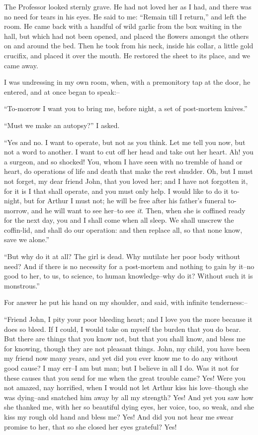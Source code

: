 \documentclass[12pt,openright]{book}
\begin{document}
The Professor looked sternly grave. He had not loved her as I had, and there was no need for tears in his eyes. He said to me: “Remain till I return,” and left the room. He came back with a handful of wild garlic from the box waiting in the hall, but which had not been opened, and placed the flowers amongst the others on and around the bed. Then he took from his neck, inside his collar, a little gold crucifix, and placed it over the mouth. He restored the sheet to its place, and we came away.

I was undressing in my own room, when, with a premonitory tap at the door, he entered, and at once began to speak:–

“To-morrow I want you to bring me, before night, a set of post-mortem knives.”

“Must we make an autopsy?” I asked.

“Yes and no. I want to operate, but not as you think. Let me tell you now, but not a word to another. I want to cut off her head and take out her heart. Ah! you a surgeon, and so shocked! You, whom I have seen with no tremble of hand or heart, do operations of life and death that make the rest shudder. Oh, but I must not forget, my dear friend John, that you loved her; and I have not forgotten it, for it is I that shall operate, and you must only help. I would like to do it to-night, but for Arthur I must not; he will be free after his father’s funeral to-morrow, and he will want to see her–to see \textit{it}. Then, when she is coffined ready for the next day, you and I shall come when all sleep. We shall unscrew the coffin-lid, and shall do our operation: and then replace all, so that none know, save we alone.”

“But why do it at all? The girl is dead. Why mutilate her poor body without need? And if there is no necessity for a post-mortem and nothing to gain by it–no good to her, to us, to science, to human knowledge–why do it? Without such it is monstrous.”

For answer he put his hand on my shoulder, and said, with infinite tenderness:–

“Friend John, I pity your poor bleeding heart; and I love you the more because it does so bleed. If I could, I would take on myself the burden that you do bear. But there are things that you know not, but that you shall know, and bless me for knowing, though they are not pleasant things. John, my child, you have been my friend now many years, and yet did you ever know me to do any without good cause? I may err–I am but man; but I believe in all I do. Was it not for these causes that you send for me when the great trouble came? Yes! Were you not amazed, nay horrified, when I would not let Arthur kiss his love–though she was dying–and snatched him away by all my strength? Yes! And yet you saw how she thanked me, with her so beautiful dying eyes, her voice, too, so weak, and she kiss my rough old hand and bless me? Yes! And did you not hear me swear promise to her, that so she closed her eyes grateful? Yes!
\end{document}
